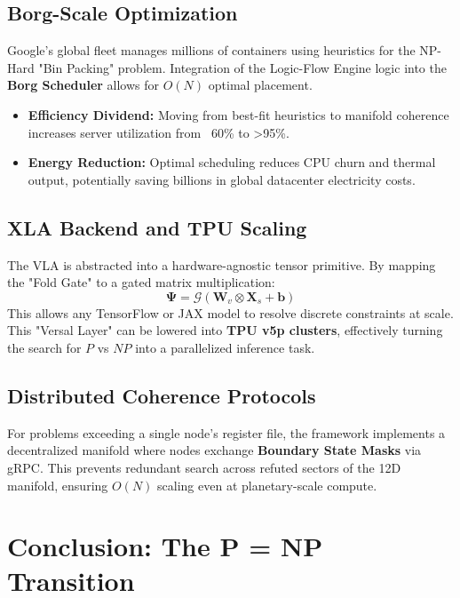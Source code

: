 \documentclass[11pt,a4paper]{article}
\begin{document}
\subsection{Borg-Scale Optimization}
Google's global fleet manages millions of containers using heuristics for the NP-Hard "Bin Packing" problem. Integration of the Logic-Flow Engine logic into the \textbf{Borg Scheduler} allows for $O(N)$ optimal placement.

\begin{itemize}
    \item \textbf{Efficiency Dividend:} Moving from best-fit heuristics to manifold coherence increases server utilization from ~60\% to >95\%.
    \item \textbf{Energy Reduction:} Optimal scheduling reduces CPU churn and thermal output, potentially saving billions in global datacenter electricity costs.
\end{itemize}

\subsection{XLA Backend and TPU Scaling}
The VLA is abstracted into a hardware-agnostic tensor primitive. By mapping the "Fold Gate" to a gated matrix multiplication:
\begin{equation}
    \mathbf{\Psi} = \mathcal{G} \left( \mathbf{W}_{v} \otimes \mathbf{X}_{s} + \mathbf{b} \right)
\end{equation}
This allows any TensorFlow or JAX model to resolve discrete constraints at scale. This "Versal Layer" can be lowered into \textbf{TPU v5p clusters}, effectively turning the search for $P$ vs $NP$ into a parallelized inference task.

\subsection{Distributed Coherence Protocols}
For problems exceeding a single node's register file, the framework implements a decentralized manifold where nodes exchange \textbf{Boundary State Masks} via gRPC. This prevents redundant search across refuted sectors of the 12D manifold, ensuring $O(N)$ scaling even at planetary-scale compute.

\newpage

\section{Conclusion: The P = NP Transition}
\end{document}
